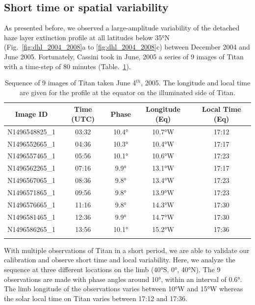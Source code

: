 \subsection{Short time or spatial  variability}

As presented before, we observed a large-amplitude variability of the
detached haze layer extinction profile at all latitudes below \ang{35}N (Fig.~\ref{fig:dhl_2004_2008}a
to \ref{fig:dhl_2004_2008}c) between December 2004 and June 2005. Fortunately, Cassini took in June, 2005 a series of 9 images of
Titan with a time-step of 80 minutes (Table.~\ref{tab:time_variability}).

\begin{table}[!ht]
    \centering
    \caption{Sequence of 9 images of Titan taken June 4$^{th}$, 2005.
    The longitude and local time are given for the profile at the equator
    on the illuminated side of Titan.}
    \vspace{.5cm}
    \begin{tabular} {c c c c c}
        \toprule
        Image ID & Time (UTC) & Phase & Longitude (Eq) & Local Time (Eq)\\
        \midrule
        N1496548825\_1 & 03:32 & \ang{10.4} & \ang{10.7}W & 17:12 \\
        N1496552665\_1 & 04:36 & \ang{10.3} & \ang{10.4}W & 17:17 \\
        N1496557465\_1 & 05:56 & \ang{10.1} & \ang{10.6}W & 17:23 \\
        N1496562265\_1 & 07:16 &  \ang{9.9} & \ang{13.1}W & 17:17 \\
        N1496567065\_1 & 08:36 &  \ang{9.8} & \ang{13.4}W & 17:23 \\
        N1496571865\_1 & 09:56 &  \ang{9.8} & \ang{13.9}W & 17:23 \\
        N1496576665\_1 & 11:16 &  \ang{9.8} & \ang{14.3}W & 17:30 \\
        N1496581465\_1 & 12:36 &  \ang{9.9} & \ang{14.7}W & 17:30 \\
        N1496586265\_1 & 13:56 & \ang{10.1} & \ang{15.2}W & 17:36 \\
        \bottomrule
        \label{tab:time_variability}
    \end{tabular}
\end{table}

With multiple observations of Titan in a short period, we are able to validate our calibration and
observe short time and local variability. Here, we analyze the sequence at three different
locations on the limb (\ang{40}S, \ang{0}, \ang{40}N). The 9 observations are made with phase
angles around \ang{10}, within an interval of \ang{0.6}. The limb longitude of the observations
varies  between \ang{10}W and \ang{15}W whereas the solar local time on Titan varies between
17:12 and 17:36.

